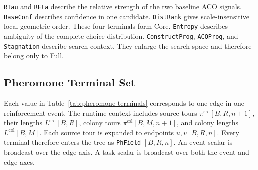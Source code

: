 \documentclass[letterpaper,journal]{IEEEtran}
\begin{document}
\texttt{RTau} and \texttt{REta} describe the relative strength of the two
baseline ACO signals.
\texttt{BaseConf} describes confidence in one candidate.
\texttt{DistRank} gives scale-insensitive local geometric order.
These four terminals form Core.
\texttt{Entropy} describes ambiguity of the complete choice distribution.
\texttt{ConstructProg}, \texttt{ACOProg}, and \texttt{Stagnation} describe
search context.
They enlarge the search space and therefore belong only to Full.

\subsection{Pheromone Terminal Set}

Each value in Table~\ref{tab:pheromone-terminals} corresponds to one edge in
one reinforcement event.
The runtime context includes source tours
\(\pi^{\mathrm{src}}[B,R,n+1]\), their lengths
\(L^{\mathrm{src}}[B,R]\), colony tours
\(\pi^{\mathrm{col}}[B,M,n+1]\), and colony lengths
\(L^{\mathrm{col}}[B,M]\).
Each source tour is expanded to endpoints \(u,v[B,R,n]\).
Every terminal therefore enters the tree as
\texttt{PhField} \([B,R,n]\).
An event scalar is broadcast over the edge axis.
A task scalar is broadcast over both the event and edge axes.
\end{document}
